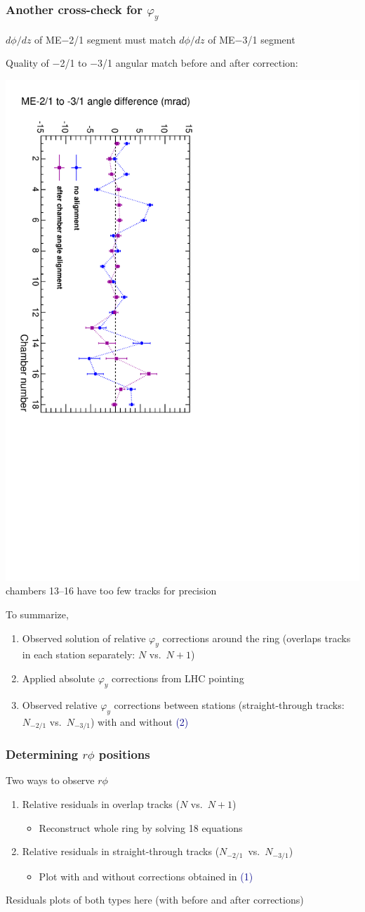 \documentclass[compress]{beamer}
\begin{document}
\begin{frame}
\frametitle{Another cross-check for $\varphi_y$}
\small

$d\phi/dz$ of ME$-$2/1 segment must match $d\phi/dz$ of ME$-$3/1 segment

Quality of $-$2/1 to $-$3/1 angular match before and after correction:
\begin{center}
\includegraphics[height=0.65\linewidth, angle=90]{angle_matching.pdf} chambers 13--16 have too few tracks for precision
\end{center}

To summarize,
\begin{enumerate}
\item Observed solution of relative $\varphi_y$ corrections around the ring (overlaps tracks in each station separately: $N$ vs.\ $N+1$)
\item Applied absolute $\varphi_y$ corrections from LHC pointing
\item Observed relative $\varphi_y$ corrections between stations (straight-through tracks: $N_{-2/1}$ vs.\ $N_{-3/1}$) with and without \textcolor{darkblue}{(2)}
\end{enumerate}
\end{frame}

\begin{frame}
\frametitle{Determining $r\phi$ positions}

Two ways to observe $r\phi$
\begin{enumerate}
\item Relative residuals in overlap tracks ($N$ vs.\ $N+1$)
\begin{itemize}
\item Reconstruct whole ring by solving 18 equations
\end{itemize}
\item Relative residuals in straight-through tracks \mbox{($N_{-2/1}$ vs.\ $N_{-3/1}$)\hspace{-1 cm}}
\begin{itemize}
\item Plot with and without corrections obtained in \textcolor{darkblue}{(1)}
\end{itemize}
\end{enumerate}

\vfill
Residuals plots of both types here (with before and after corrections)

\end{frame}
\end{document}
